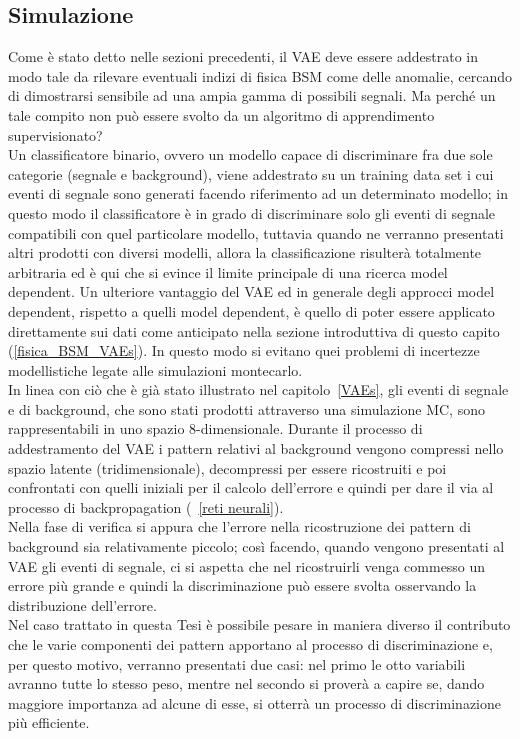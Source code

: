 \subsection{Simulazione}
\label{simulazione}
Come è stato detto nelle sezioni precedenti, il VAE deve essere addestrato in modo tale da rilevare eventuali indizi di fisica BSM come delle anomalie, cercando di dimostrarsi sensibile ad una ampia gamma di possibili segnali. Ma perché un tale compito non può essere svolto da un algoritmo di apprendimento supervisionato?\\
Un classificatore binario, ovvero un modello capace di discriminare fra due sole categorie (segnale e background), viene addestrato su un training data set i cui eventi di segnale sono generati facendo riferimento ad un determinato modello; in questo modo il classificatore è in grado di discriminare solo gli eventi di segnale compatibili con quel particolare modello, tuttavia quando ne verranno presentati altri prodotti con diversi modelli, allora la classificazione risulterà totalmente arbitraria ed è qui che si evince il limite principale di una ricerca model dependent. Un ulteriore vantaggio del VAE ed in generale degli approcci model dependent, rispetto a quelli model dependent, è quello di poter essere applicato direttamente sui dati come anticipato nella sezione introduttiva di questo capito (\ref{fisica_BSM_VAEs}). In questo modo si evitano quei problemi di incertezze modellistiche legate alle simulazioni montecarlo.\\
In linea con ciò che è già stato illustrato nel capitolo~\ref{VAEs}, gli eventi di segnale e di background, che sono stati prodotti attraverso una simulazione MC, sono rappresentabili in uno spazio 8-dimensionale. Durante il processo di addestramento del VAE i pattern relativi al background vengono compressi nello spazio latente (tridimensionale), decompressi per essere ricostruiti e poi confrontati con quelli iniziali per il calcolo dell'errore e quindi per dare il via al processo di backpropagation (~\ref{reti neurali}). \\
Nella fase di verifica si appura che l'errore nella ricostruzione dei pattern di background sia relativamente piccolo; così facendo, quando vengono presentati al VAE gli eventi di segnale, ci si aspetta che nel ricostruirli venga commesso un errore più grande e quindi la discriminazione può essere svolta osservando la distribuzione dell'errore. \\
Nel caso trattato in questa Tesi è possibile pesare in maniera diverso il contributo che le varie componenti dei pattern apportano al processo di discriminazione e, per questo motivo, verranno presentati due casi: nel primo le otto variabili avranno tutte lo stesso peso, mentre nel secondo si proverà a capire se, dando maggiore importanza ad alcune di esse, si otterrà un processo di discriminazione più efficiente. \\ 
